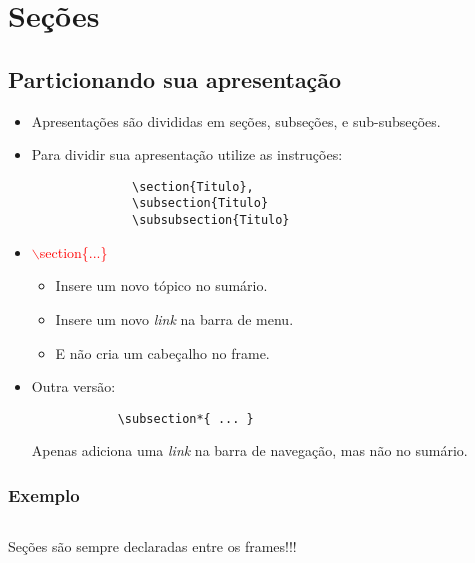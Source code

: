 \section{Seções}
\subsection{Particionando sua apresentação}


\begin{frame}[fragile]
  \begin{itemize}[<+->]
     \item Apresentações são divididas em seções, subseções, e sub-subseções.
     \item Para dividir sua apresentação utilize as instruções:
          \begin{verbatim}
              \section{Titulo},
              \subsection{Titulo}
              \subsubsection{Titulo}
          \end{verbatim}
    \item \textcolor{red}{$\backslash$section\{...\}}
          \begin{itemize}
             \item Insere um novo tópico no sumário.
             \item Insere um novo \textit{link} na barra de menu.
             \item E não cria um cabeçalho no frame.
          \end{itemize}

     \item Outra versão:
          \begin{verbatim}
            \subsection*{ ... }
          \end{verbatim}
          Apenas adiciona uma \textit{link} na barra de navegação, mas não no sumário.
   \end{itemize}
\end{frame}


\begin{frame}
  \frametitle{Exemplo}

  \inputminted[fontsize=\scriptsize]{tex}{codes/05-secoes.tex}

  Seções são sempre declaradas entre os frames!!!

\end{frame}


